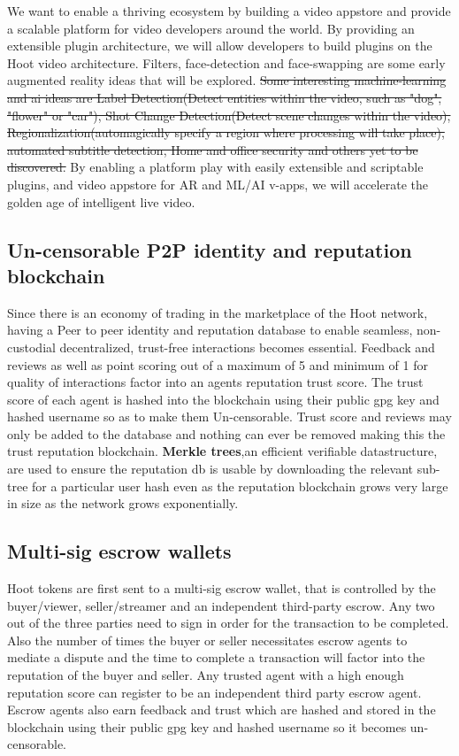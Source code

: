 \documentclass{article}
\begin{document}
 We want to enable a
thriving ecosystem by building a video appstore and provide a scalable
platform for video developers around the world. By providing an
extensible plugin architecture, we will allow developers to build
plugins on the Hoot video architecture. Filters, face-detection and face-swapping
are some early augmented reality ideas that will be explored. \sout{Some interesting
machine-learning and ai ideas are Label Detection(Detect entities
within the video, such as "dog", "flower" or "car"), Shot Change
Detection(Detect scene changes within the video),
Regionalization(automagically specify a region where processing will
take place), automated subtitle detection, Home and office security and others yet to be discovered.} By enabling a platform
play with easily extensible and scriptable plugins, and video appstore
for AR and ML/AI v-apps, we will accelerate the golden age of
intelligent live video.


\subsection{Un-censorable P2P identity and reputation blockchain}
Since there is an economy of trading in the marketplace of the Hoot network, having a Peer to peer
identity and reputation database to enable seamless, non-custodial
decentralized, trust-free interactions becomes essential. Feedback and reviews as well as point scoring out of a maximum of 5 and minimum of 1 for quality of interactions factor into an agents reputation trust score. The trust score of each agent is hashed into the blockchain using their public gpg key and hashed username so as to make them Un-censorable. Trust score and reviews may only be added to the database and nothing can ever be removed making this the trust reputation blockchain. \textbf{Merkle trees},an efficient verifiable datastructure, are used to ensure the reputation db is usable by downloading the relevant sub-tree for a particular user hash even as the reputation blockchain grows very large in size as the network grows exponentially.

\subsection{Multi-sig escrow wallets}
Hoot tokens are first sent to a multi-sig escrow wallet, that is controlled by the buyer/viewer, seller/streamer and an
independent third-party escrow. Any
two out of the three parties need to sign in order for the transaction to be
completed. Also the number of times the buyer or seller necessitates
escrow agents to mediate a dispute and the time to complete a
transaction will factor into the reputation of the buyer and
seller. Any trusted agent with a high enough reputation score can
register to be an independent third party escrow agent. Escrow agents
also earn feedback and trust which are hashed and stored in the
blockchain using their public gpg key and hashed username so it
becomes un-censorable.
\end{document}
